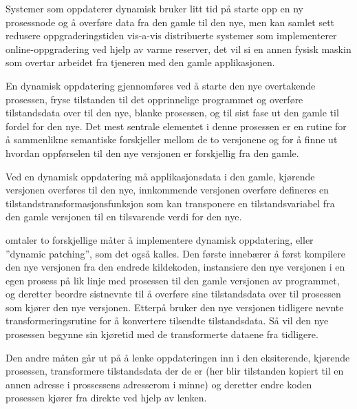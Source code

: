 Systemer som oppdaterer dynamisk bruker litt tid på starte opp en ny prosessnode og å overføre data fra den gamle til den nye, men kan samlet sett redusere oppgraderingstiden vis-a-vis distribuerte systemer som implementerer online-oppgradering ved hjelp av varme reserver, det vil si en annen fysisk maskin som overtar arbeidet fra tjeneren med den gamle applikasjonen.

En dynamisk oppdatering gjennomføres ved å starte den nye overtakende prosessen, fryse tilstanden til det opprinnelige programmet og overføre tilstandsdata over til den nye, blanke prosessen, og til sist fase ut den gamle til fordel for den nye. Det mest sentrale elementet i denne prosessen er en rutine for å sammenlikne semantiske forskjeller mellom de to versjonene og for å finne ut hvordan oppførselen til den nye versjonen er forskjellig fra den gamle.

Ved en dynamisk oppdatering må applikasjonsdata i den gamle, kjørende versjonen overføres til den nye, innkommende versjonen overføre defineres en tilstandstransformasjonsfunksjon som kan transponere en tilstandsvariabel fra den gamle versjonen til en tilsvarende verdi for den nye.

\cite{hicks2005dsu} omtaler to forskjellige måter å implementere dynamisk oppdatering, eller ''dynamic patching'', som det også kalles. Den første innebærer å først kompilere den nye versjonen fra den endrede kildekoden, instansiere den nye versjonen i en egen prosess på lik linje med prosessen til den gamle versjonen av programmet, og deretter beordre sistnevnte til å overføre sine tilstandsdata over til prosessen som kjører den nye versjonen. Etterpå bruker den nye versjonen tidligere nevnte transformeringsrutine for å konvertere tilsendte tilstandsdata. Så vil den nye prosessen begynne sin kjøretid med de transformerte dataene fra tidligere.

Den andre måten går ut på å lenke oppdateringen inn i den eksiterende, kjørende prosessen, transformere tilstandsdata der de er (her blir tilstanden kopiert til en annen adresse i prossessens adresserom i minne) og deretter endre koden prosessen kjører fra direkte ved hjelp av lenken.
